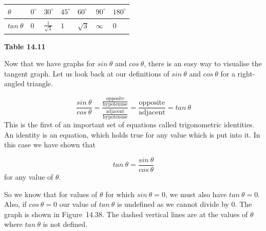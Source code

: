 \begin{table}[H]
\begin{center}
\label{m39414*id89593}
\noindent

\begin{tabular}[t]{|l|l|l|l|l|l|l|}\hline
$\theta $&
${0}^{\circ }$&
${30}^{\circ }$&
${45}^{\circ }$&
${60}^{\circ }$&
${90}^{\circ }$&
${180}^{\circ }$
\\ \hline
$tan~\theta $&
$0$ &
$\frac{1}{\sqrt{3}}$&
$1$ &
$\sqrt{3}$&
$\infty $&
$0$%
\\ \hline
\end{tabular}
\end{center}
\begin{center}{\small\bfseries Table 14.11}\end{center}
\end{table}
\par
Now that we have graphs for $sin~\theta $ and $cos~\theta $, there is an easy way to visualise the tangent graph. Let us look back at our definitions of $sin~\theta $ and $cos~\theta $ for a right-angled triangle.\par 
\nopagebreak\noindent{}
\begin{equation*}
\frac{sin~\theta }{cos~\theta }=\frac{\frac{\mbox{opposite}}{\mbox{hypotenuse}}}{\frac{\mbox{adjacent}}{\mbox{hypotenuse}}}=\frac{\mbox{opposite}}{\mbox{adjacent}}=tan~\theta 
\end{equation*}
This is the first of an important set of equations called trigonometric identities. An identity is an equation, which holds true for any value which is put into it. In this case we have shown that\par 
\nopagebreak\noindent{}
\begin{equation*}
tan~\theta =\frac{sin~\theta }{cos~\theta }
\end{equation*}
for any value of $\theta $.\par 
So we know that for values of $\theta $ for which $sin~\theta =0$, we must also have $tan~\theta =0$. Also, if $cos~\theta =0$ our value of $tan~\theta $ is undefined as we cannot divide by $0$. The graph is shown in Figure~14.38. The dashed vertical lines are at the values of $\theta $ where $tan~\theta $ is not defined.\par 
